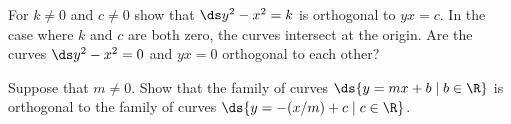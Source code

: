 \begin{exercises}
\begin{exercise} For $k\not= 0$ and $c \neq 0$ show that $\ds y^2 -x^2 =k$ is orthogonal to
$yx =c$. In the case where $k$ and $c$ are both zero, the curves
  intersect at the origin. Are the curves $\ds y^2 -x^2 =0$ and $yx=0$
  orthogonal to each other?
\end{exercise}

\begin{exercise} Suppose that $m\neq 0$. Show that the family of curves
$\ds \{y=mx+b \mid b\in \R \}$ is orthogonal to the
family of curves $\ds \{y=-(x/m)+c \mid c \in \R\}$.
\end{exercise}

\end{exercises}
